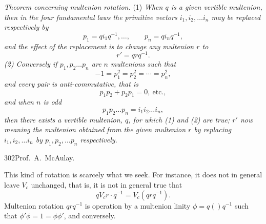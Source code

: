 \documentclass[11pt]{article}
\begin{document}
\indent \emph{Theorem concerning multenion rotation.} (1) \emph{When $q$ is a given vertible multenion, then in the four fundamental laws the primitive vectors $i_1,i_2,\ldots i_n$ may be replaced respectively by}
\begin{equation}p_1=qi_1q^{-1},\ldots,\qquad p_n=qi_nq^{-1},\tag{1}\end{equation}
\emph{and the effect of the replacement is to change any multenion $r$ to}
\begin{equation}r'=qrq^{-1}.\tag{2}\end{equation}
\emph{(2) Conversely if $p_1,p_2\ldots p_n$ are $n$ multenions such that}
\begin{equation}-1=p_1^2=p_2^2=\cdots=p_n^2,\tag{3}\end{equation}
\emph{and every pair is anti-commutative, that is}
\begin{equation}p_1p_2+p_2p_1=0,\ \text{etc.},\tag{4}\end{equation}
\emph{and when $n$ is odd}
\begin{equation}p_1p_2\ldots p_n=i_1i_2\ldots i_n,\tag{5}\end{equation}
\emph{then there exists a vertible multenion, $q$, for which (1) and (2) are true; $r'$ now meaning the multenion obtained from the given multenion $r$ by replacing $i_1,i_2,\ldots i_n$ by $p_1,p_2,\ldots p_n$ respectively.}

\newpage\thispagestyle{empty}\begin{center}302\hfill Prof.\ A.\ McAulay.\end{center}
This kind of rotation is scarcely what we seek. For instance, it does not in general leave $V_c$ unchanged, that is, it is not in general true that
\begin{equation}qV_cr\cdot q^{-1}=V_c(qrq^{-1}).\tag{6}\end{equation}
Multenion rotation $qrq^{-1}$ is operation by a multenion linity $\phi=q()q^{-1}$ such that $\phi'\phi=1=\phi\phi'$, and conversely.
\end{document}
